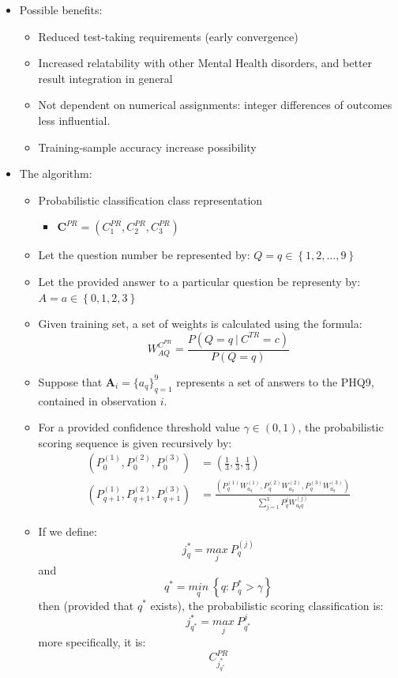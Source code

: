 \documentclass[12pt,]{article}
\providecommand{\tightlist}{%
  \setlength{\itemsep}{0pt}\setlength{\parskip}{0pt}}
\begin{document}
\begin{itemize}
\tightlist
\item
  Possible benefits:

  \begin{itemize}
  \tightlist
  \item
    Reduced test-taking requirements (early convergence)
  \item
    Increased relatability with other Mental Health disorders, and
    better result integration in general
  \item
    Not dependent on numerical assignments: integer differences of
    outcomes less influential.
  \item
    Training-sample accuracy increase possibility
  \end{itemize}
\item
  The algorithm:

  \begin{itemize}
  \item
    Probabilistic classification class representation

    \begin{itemize}
    \tightlist
    \item
      \(\mathbf{C}^{PR}=(C_{1}^{PR},C_{2}^{PR},C_{3}^{PR})\)
    \end{itemize}
  \item
    Let the question number be represented by:
    \(Q=q\in\left \{ 1,2,\ldots, 9 \right \}\)
  \item
    Let the provided answer to a particular question be representy by:
    \(A=a \in\left \{ 0,1,2,3 \right \}\)
  \item
    Given training set, a set of weights is calculated using the
    formula: \[
    W_{AQ}^{C^{PR}} = \frac{P\left(Q=q \  \Big | \ C^{TR}=c \right) }{P \left( Q = q   \right) } \tag{1.3.2 - 1} \label{1.3.2-1}
    \]
  \item
    Suppose that \(\mathbf{A}_{i}=\{ a_{q}\}_{q=1}^{9}\) represents a
    set of answers to the PHQ9, contained in observation \(i\).
  \item
    For a provided confidence threshold value \(\gamma \in (0,1)\), the
    probabilistic scoring sequence is given recursively by:
    \begin{align*}
    \left(P_{0}^{(1)},P_{0}^{(2)},P_{0}^{(3)} \right) &= \left( \frac{1}{3}, \frac{1}{3}, \frac{1}{3}\right) \\[0.5em]
    \left(P_{q+1}^{(1)},P_{q+1}^{(2)},P_{q+1}^{(3)} \right) &= \frac{\left(P_{q}^{(1)}W_{a_{q}}^{(1)}, P_{q}^{(2)}W_{a_{q}}^{(2)}, P_{q}^{(3)}W_{a_{q}}^{(3)}\right) }{\sum_{j=1}^{3}  P_{q}^{j}W_{a_{q}q}^{(j)}} \tag{1.3.2 - 2} \label{1.3.2 - 2}
    \end{align*}
  \item
    If we define: \[j_{q}^{*}= \underset{j}{max} \  P_{q}^{(j)}\] and
    \[q^{*}=\underset{q}{min} \ \left \{q : P^{*}_{q} > \gamma    \right \} \]
    then (provided that \(q^{*}\) exists), the probabilistic scoring
    classification is:
    \[j_{q^{*}}^{*}=\underset{j}{max} \ P_{q^{*}}^{j}\] more
    specifically, it is: \[C^{PR}_{j_{q^{*}}^{*}}\]
  \end{itemize}
\end{itemize}
\end{document}
